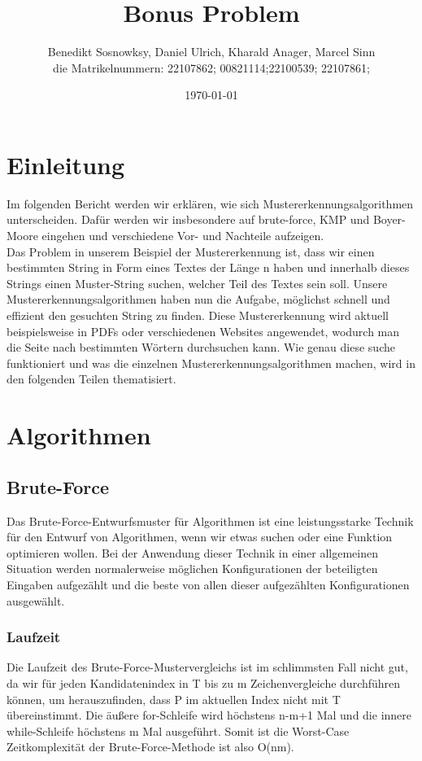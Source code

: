 \documentclass[14pt]{article}
\title{Bonus Problem}
\author{Benedikt Sosnowksy, Daniel Ulrich, Kharald Anager, Marcel Sinn \\
die Matrikelnummern: 22107862; 00821114;22100539;  22107861; }
\date{\today}
\begin{document}
\maketitle


\section{Einleitung}
Im folgenden Bericht werden wir erklären, wie sich Mustererkennungsalgorithmen unterscheiden. Dafür werden wir insbesondere auf brute-force, KMP und Boyer-Moore eingehen und verschiedene Vor- und Nachteile aufzeigen.\\

Das Problem in unserem Beispiel der Mustererkennung ist, dass wir einen bestimmten String in Form eines Textes der Länge n haben und innerhalb dieses Strings einen Muster-String suchen, welcher Teil des Textes sein soll. Unsere Mustererkennungsalgorithmen haben nun die Aufgabe, möglichst schnell und effizient den gesuchten String zu finden. Diese Mustererkennung wird aktuell beispielsweise in PDFs oder verschiedenen Websites angewendet, wodurch man die Seite nach bestimmten Wörtern durchsuchen kann. Wie genau diese suche funktioniert und was die einzelnen Mustererkennungsalgorithmen machen, wird in den folgenden Teilen thematisiert.

\section{Algorithmen}
\subsection{Brute-Force}

Das Brute-Force-Entwurfsmuster für Algorithmen ist eine leistungsstarke Technik für den Entwurf von Algorithmen, wenn wir etwas suchen oder eine Funktion optimieren wollen. Bei der Anwendung dieser Technik in einer allgemeinen Situation werden normalerweise möglichen Konfigurationen der beteiligten Eingaben aufgezählt und die beste von allen dieser aufgezählten Konfigurationen ausgewählt.

\subsubsection{Laufzeit}
Die Laufzeit des Brute-Force-Mustervergleichs ist im schlimmsten Fall nicht gut, da wir für jeden Kandidatenindex in T bis zu m Zeichenvergleiche durchführen können, um herauszufinden, dass P im aktuellen Index nicht mit T übereinstimmt. Die äußere for-Schleife wird höchstens n-m+1 Mal und die innere while-Schleife höchstens m Mal ausgeführt. Somit ist die Worst-Case Zeitkomplexität der Brute-Force-Methode ist also O(nm).
\end{document}
